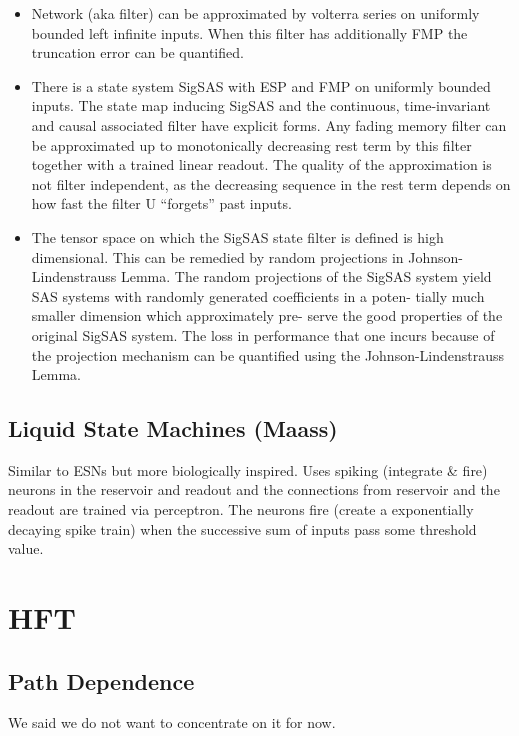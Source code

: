 \documentclass{article}
\begin{document}
\begin{itemize}
    \item Network (aka filter) can be approximated by volterra series on uniformly bounded left infinite inputs. When this filter has additionally FMP the truncation error can be quantified.
    
    \item There is a state system SigSAS with ESP and FMP on uniformly bounded inputs. The state map inducing SigSAS and the continuous, time-invariant and causal associated filter have explicit forms. Any fading memory filter can be approximated up to monotonically decreasing rest term by this filter together with a trained linear readout. The quality of the approximation is not filter independent, as the decreasing sequence in the rest term depends on how fast the filter U “forgets” past inputs.
    
    \item The tensor space on which the SigSAS state filter is defined is high dimensional. This can be remedied by random projections in Johnson-Lindenstrauss Lemma. The random projections of the SigSAS system yield SAS systems with randomly generated coefficients in a poten- tially much smaller dimension which approximately pre- serve the good properties of the original SigSAS system. The loss in performance that one incurs because of the projection mechanism can be quantified using the Johnson-Lindenstrauss Lemma.
    
    
\end{itemize}

\subsection{Liquid State Machines (Maass) \cite{maass}}
Similar to ESNs but more biologically inspired. Uses spiking (integrate \& fire) neurons in the reservoir and readout and the connections from reservoir and the readout are trained via perceptron. The neurons fire (create a exponentially decaying spike train) when the successive sum of inputs pass some threshold value.

\section{HFT}

\subsection{Path Dependence \cite{pathdep} }
We said we do not want to concentrate on it for now.
\end{document}
